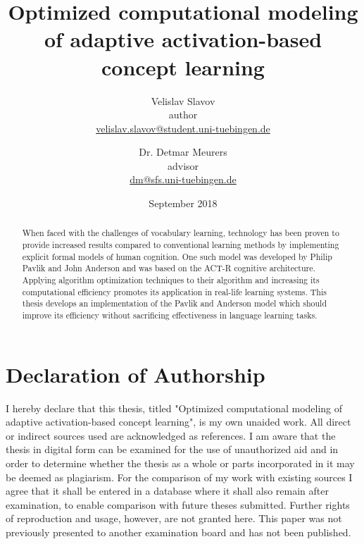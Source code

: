\documentclass[a4paper]{report}
\begin{document}
\title{Optimized computational modeling of adaptive activation-based concept learning}
\bigskip
\author{
	Velislav Slavov \\ \normalsize{author} \\ \normalsize\url{velislav.slavov@student.uni-tuebingen.de}\medskip
	\and
	Dr. Detmar Meurers \\ \normalsize{advisor} \\ \normalsize\url{dm@sfs.uni-tuebingen.de}\bigskip
}
\date{September 2018}
\maketitle



\begin{abstract}

When faced with the challenges of vocabulary learning, technology has been proven to provide increased results compared to conventional learning methods by implementing explicit formal models of human cognition. One such model was developed by Philip Pavlik and John Anderson and was based on the ACT-R cognitive architecture. Applying algorithm optimization techniques to their algorithm and increasing its computational efficiency promotes its application in real-life learning systems. This thesis develops an implementation of the Pavlik and Anderson model which should improve its efficiency without sacrificing effectiveness in language learning tasks.

\end{abstract}



\section*{Declaration of Authorship}
I hereby declare that this thesis, titled "Optimized computational modeling of adaptive activation-based concept learning", is my own unaided work. All direct or indirect sources used are acknowledged as references.
I am aware that the thesis in digital form can be examined for the use of unauthorized aid and in order to determine whether the thesis as a whole or parts incorporated in it may be deemed as plagiarism. For the comparison of my work with existing sources I agree that it shall be entered in a database where it shall also remain after examination, to enable comparison with future theses submitted. Further rights of reproduction and usage, however, are not granted here.
This paper was not previously presented to another examination board and has not been published.
\end{document}

